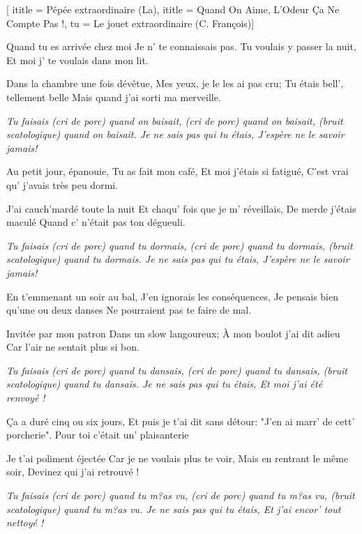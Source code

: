  [
ititle = {Pépée extraordinaire (La)},
ititle = {Quand On Aime, L'Odeur Ça Ne Compte Pas !},
tu = {Le jouet extraordinaire (C. François)}]


\beginverse
Quand tu es arrivée chez moi
Je n' te connaissais pas.
Tu voulais y passer la nuit,
Et moi j' te voulais dans mon lit.
\endverse

\beginverse
Dans la chambre une fois dévêtue,
Mes yeux, je le les ai pas cru;
Tu étais bell', tellement belle
Mais quand j'ai sorti ma merveille.
\endverse

\beginverse
\textit {Tu faisais (cri de porc) quand on baisait,
(cri de porc) quand on baisait,
(bruit scatologique) quand on baisait.
Je ne sais pas qui tu étais,
J'espère ne le savoir jamais!}
\endverse

\beginverse
Au petit jour, épanouie,
Tu as fait mon café,
Et moi j'étais si fatigué,
C'est vrai qu' j'avais très peu dormi.
\endverse

\beginverse
J'ai cauch'mardé toute la nuit
Et chaqu' fois que je m' réveillais,
De merde j'étais maculé
Quand c' n'était pas ton dégueuli.
\endverse

\beginverse
\textit {Tu faisais (cri de porc) quand tu dormais,
(cri de porc) quand tu dormais,
(bruit scatologique) quand tu dormais.
Je ne sais pas qui tu étais,
J'espère ne le savoir jamais!}
\endverse

\beginverse
En t'emmenant un soir au bal,
J'en ignorais les conséquences,
Je pensais bien qu'une ou deux danses
Ne pourraient pas te faire de mal.
\endverse

\beginverse
Invitée par mon patron
Dans un slow langoureux;
À mon boulot j'ai dit adieu
Car l'air ne sentait plus si bon.
\endverse

\beginverse
\textit {Tu faisais (cri de porc) quand tu dansais,
(cri de porc) quand tu dansais,
(bruit scatologique) quand tu dansais.
Je ne sais pas qui tu étais,
Et moi j'ai été renvoyé !}
\endverse

\beginverse
Ça a duré cinq ou six jours,
Et puis je t'ai dit sans détour:
"J'en ai marr' de cett' porcherie".
Pour toi c'était un' plaisanterie
\endverse

\beginverse
Je t'ai poliment éjectée
Car je ne voulais plus te voir,
Mais en rentrant le même soir,
Devinez qui j'ai retrouvé !
\endverse

\beginverse
\textit {Tu faisais (cri de porc) quand tu m?as vu,
(cri de porc) quand tu m?as vu,
(bruit scatologique) quand tu m?as vu.
Je ne sais pas qui tu étais,
Et j'ai encor' tout nettoyé !}
\endverse

\endsong
